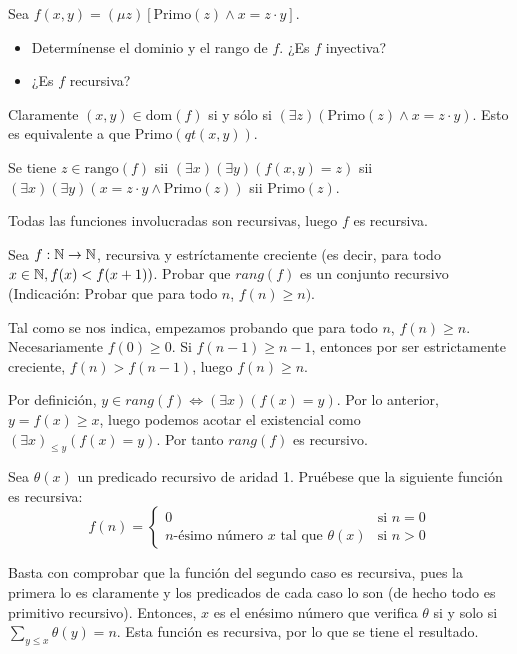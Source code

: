 \documentclass[twoside]{article}
\begin{document}
\newpage
\begin{ejercicio}{24}
Sea $f(x,y) = (μz)[\text{Primo}(z) \land x = z \cdot y]$.
\begin{itemize}
	\item Determínense el dominio y el rango de $f$. ¿Es $f$ inyectiva?
	\item ¿Es $f$ recursiva?
\end{itemize}
\end{ejercicio}
\begin{solucion}
Claramente $(x,y) \in \text{dom}(f)$ si y sólo si $(\exists z)(\text{Primo}(z) \land x = z\cdot y)$. Esto es equivalente a que $\text{Primo}(qt(x,y))$.

Se tiene $z \in \text{rango}(f)$ sii $(\exists x)(\exists y) (f(x,y)=z)$ sii $(\exists x)(\exists y) (x=z\cdot y \land \text{Primo}(z))$ sii $\text{Primo}(z)$.

Todas las funciones involucradas son recursivas, luego $f$ es recursiva.
\end{solucion}

\newpage

\begin{ejercicio}{26}
Sea $f : \mathbb{N} \to \mathbb{N}$, recursiva y estríctamente creciente (es decir, para todo $x \in \mathbb{N},
f(x) < f(x + 1))$. Probar que $rang(f)$ es un conjunto recursivo (Indicación: Probar que para todo
$n$, $f(n) \geq n)$.
\end{ejercicio}
\begin{solucion}
Tal como se nos indica, empezamos probando que para todo $n$, $f(n) \geq n$. Necesariamente $f(0)\geq 0$. Si $f(n-1)\geq n-1$, entonces por ser estrictamente creciente, $f(n)>f(n-1)$, luego $f(n)\geq n$. 

Por definición, $y\in rang(f)\Leftrightarrow (\exists x)(f(x)=y)$. Por lo anterior, $y=f(x)\geq x$, luego podemos acotar el existencial como $(\exists x)_{\leq y}(f(x)=y)$. Por tanto $rang(f)$ es recursivo.
\end{solucion}

\newpage

\begin{ejercicio}{27}
Sea $\theta(x)$ un predicado recursivo de aridad 1. Pruébese que la siguiente función es
recursiva:
\[
f(n) =\begin{cases}
0 & \text{si } n=0\\
n\text{-ésimo número }x \text{ tal que }\theta(x) & \text{si }n > 0
\end{cases}
\]
\end{ejercicio}
\begin{solucion}
Basta con comprobar que la función del segundo caso es recursiva, pues la primera lo es claramente y los predicados de cada caso lo son (de hecho todo es primitivo recursivo). Entonces, $x$ es el enésimo número que verifica $\theta$ si y solo si $\sum_{y\leq x}\theta(y)=n$. Esta función es recursiva, por lo que se tiene el resultado.
\end{solucion}
\end{document}

